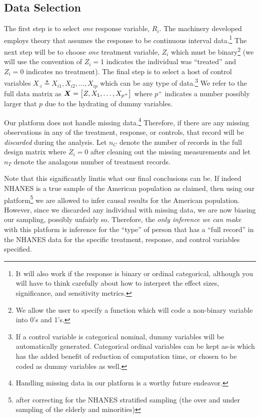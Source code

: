 \documentclass[12pt]{article}
\begin{document}
\subsection{Data Selection}

The first step is to select \textit{one} response variable, $R_i$. The machinery developed employs theory that assumes the response to be continuous interval data.\footnote{It will also work if the response is binary or ordinal categorical, although you will have to think carefully about how to interpret the effect sizes, significance, and sensitivity metrics.} The next step will be to choose \textit{one} treatment variable, $Z_i$ which must be binary\footnote{We allow the user to specify a function which will code a non-binary variable into 0's and 1's.} (we will use the convention of $Z_i = 1$ indicates the individual was ``treated'' and $Z_i = 0$ indicates no treatment). The final step is to select a host of control variables $X_{\cdot i} \triangleq X_{i1}, X_{i2}, \ldots, X_{ip}$ which can be any type of data.\footnote{If a control variable is categorical nominal, dummy variables will be automatically generated. Categorical ordinal variables can be kept as-is which has the added benefit of reduction of computation time, or chosen to be coded as dummy variables as well.} We refer to the full data matrix as $\boldsymbol{X} = \left[Z, X_1, \ldots, X_{p^+}\right]$ where $p^+$ indicates a number possibly larger that $p$ due to the hydrating of dummy variables.

Our platform does not handle missing data.\footnote{Handling missing data in our platform is a worthy future endeavor.} Therefore, if there are any missing observations in any of the treatment, response, or controls, that record will be \textit{discarded} during the analysis. Let $n_C$ denote the number of records in the full design matrix where $Z_i = 0$ after cleaning out the missing measurements and let $n_T$ denote the analagous number of treatment records.

Note that this significantly limtis what our final conclusions can be. If indeed NHANES is a true sample of the American population as claimed, then using our platform\footnote{after correcting for the NHANES stratified sampling (the over and under sampling of the elderly and minorities)} we are allowed to infer causal results for the American population. However, since we discarded any individual with missing data, we are now biasing our sampling, possibly unfairly so. Therefore, the \textit{only inference we can make} with this platform is inference for the ``type'' of person that has a ``full record'' in the NHANES data for the specific treatment, response, and control variables specified.
\end{document}
